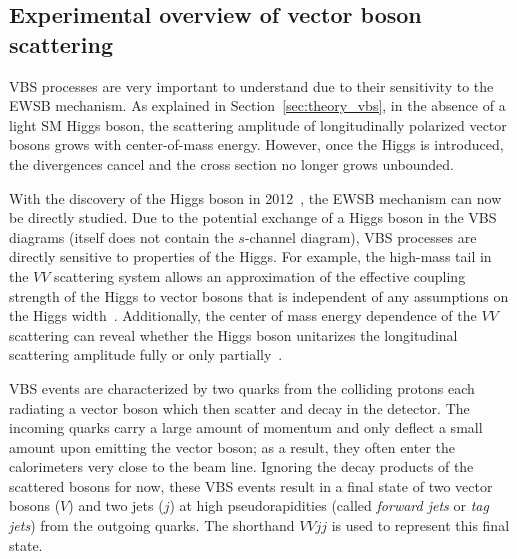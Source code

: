 \subsection{Experimental overview of vector boson scattering}\label{ssww13tev:vbs_theory}
VBS processes are very important to understand due to their sensitivity to the EWSB mechanism.
As explained in Section~\ref{sec:theory_vbs}, in the absence of a light SM Higgs boson, the scattering amplitude of longitudinally polarized vector bosons grows with center-of-mass energy. %
However, once the Higgs is introduced, the divergences cancel and the cross section no longer grows unbounded. %

With the discovery of the Higgs boson in 2012~\cite{HIGG-2012-27, CMS-HIG-12-028}, the EWSB mechanism can now be directly studied.
Due to the potential exchange of a Higgs boson in the VBS diagrams (\ssww itself does not contain the $s$-channel diagram), VBS processes are directly sensitive to properties of the Higgs.
For example, the high-mass tail in the $VV$ scattering system allows an approximation of the effective coupling strength of the Higgs to vector bosons that is independent of any assumptions on the Higgs width~\cite{2015.higgs-constraints-from-vbs}.
Additionally, the center of mass energy dependence of the $VV$ scattering can reveal whether the Higgs boson unitarizes the longitudinal scattering amplitude fully or only partially~\cite{2014.higgs-WW-scattering-theory}.

VBS events are characterized by two quarks from the colliding protons each radiating a vector boson which then scatter and decay in the detector.
The incoming quarks carry a large amount of momentum and only deflect a small amount upon emitting the vector boson; as a result, they often enter the calorimeters very close to the beam line.
Ignoring the decay products of the scattered bosons for now, these VBS events result in a final state of two vector bosons ($V$) and two jets ($j$) at high pseudorapidities (called \emph{forward jets} or \emph{tag jets}) from the outgoing quarks.
The shorthand $VVjj$ is used to represent this final state.

